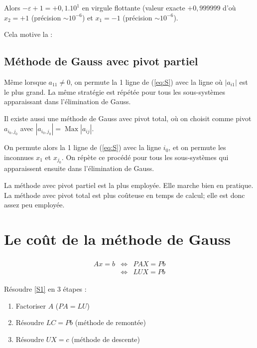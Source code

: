 \documentclass[a4paper,11pt]{article}
\DeclareMathOperator{\Max}{Max}
\theoremstyle{plain} %
\begin{document}
Alors $-\varepsilon + 1 = +0,1.10^1$ en virgule flottante (valeur exacte
$+0,999999$ d'où $x_2 = +1$ (précision $\sim 10^{-6}$) et $x_1 = -1$ (précision
$\sim 10^{-6}$).

Cela motive la :

\subsection*{Méthode de Gauss avec pivot partiel}
Même lorsque $a_{11} \ne 0$, on permute la 1 ligne de (\ref{eq:S}) avec la
ligne où $|a_{i1}|$ est le plus grand. La même stratégie est répétée pour tous les
sous-systèmes apparaissant dans l'élimination de Gauss.

\begin{remark}
    Il existe aussi une méthode de Gauss avec pivot total, où on choisit comme
    pivot $a_{i_0,j_0}$ avec $|a_{i_0,j_0}| = \Max |a_{ij}|$.

    On permute alors la 1 ligne de (\ref{eq:S}) avec la ligne $i_0$, et on
    permute les inconnues $x_1$ et $x_{j_0}$. On répète ce procédé pour tous
    les sous-systèmes qui apparaissent ensuite dans l'élimination de Gauss.

    La méthode avec pivot partiel est la plus employée. Elle marche bien en pratique.
    La méthode avec pivot total est plus coûteuse en temps de calcul; elle est donc
    assez peu employée.
\end{remark}


\section{Le coût de la méthode de Gauss}

\begin{eqnarray}
    \begin{split}
        Ax = b & \Leftrightarrow & PAX = Pb \\
        & \Leftrightarrow & LUX = Pb
    \end{split}
    \label{S1}
\end{eqnarray}

Résoudre \ref{S1} en 3 étapes :
\begin{enumerate}
    \item Factoriser $A$ ($PA = LU$)
    \item Résoudre $LC = Pb$ (méthode de remontée)
    \item Résoudre $UX = c$ (méthode de descente)
\end{enumerate}
\end{document}
